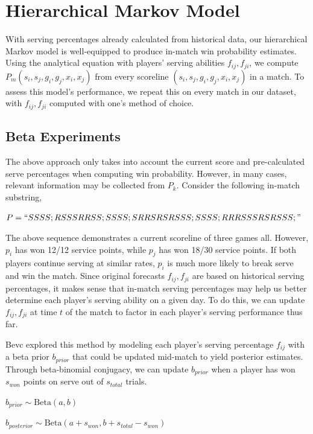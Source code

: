 \documentclass[chapterprefix=false]{report}
\begin{document}
\section{Hierarchical Markov Model}
With serving percentages already calculated from historical data, our hierarchical Markov model is well-equipped to produce in-match win probability estimates. Using the analytical equation with players' serving abilities $f_{ij},f_{ji}$, we compute $P_m(s_i,s_j,g_i,g_j,x_i,x_j)$ from every scoreline $(s_i,s_j,g_i,g_j,x_i,x_j)$ in a match. To assess this model's performance, we repeat this on every match in our dataset, with $f_{ij},f_{ji}$ computed with one's method of choice.

\subsection{Beta Experiments}
The above approach only takes into account the current score and pre-calculated serve percentages when computing win probability. However, in many cases, relevant information may be collected from $P_k$. Consider the following in-match substring, 

$P=``SSSS;RSSSRRSS;SSSS;SRRSRSRSSS;SSSS;RRRSSSRSRSSS;"$

The above sequence demonstrates a current scoreline of three games all. However, $p_i$ has won 12/12 service points, while $p_j$ has won 18/30 service points. If both players continue serving at similar rates, $p_i$ is much more likely to break serve and win the match. Since original forecasts $f_{ij},f_{ji}$ are based on historical serving percentages, it makes sense that in-match serving percentages may help us better determine each player's serving ability on a given day. To do this, we can update $f_{ij},f_{ji}$ at time $t$ of the match to factor in each player's serving performance thus far.

Bevc explored this method by modeling each player's serving percentage $f_{ij}$ with a beta prior $b_{prior}$ that could be updated mid-match to yield posterior estimates. Through beta-binomial conjugacy, we can update $b_{prior}$ when a player has won $s_{won}$ points on serve out of $s_{total}$ trials.

\begin{center}
$b_{prior} \sim \text{Beta}(a,b)$ 

$b_{posterior} \sim \text{Beta}(a+s_{won},b+s_{total}-s_{won})$
\end{center}

\end{document}
